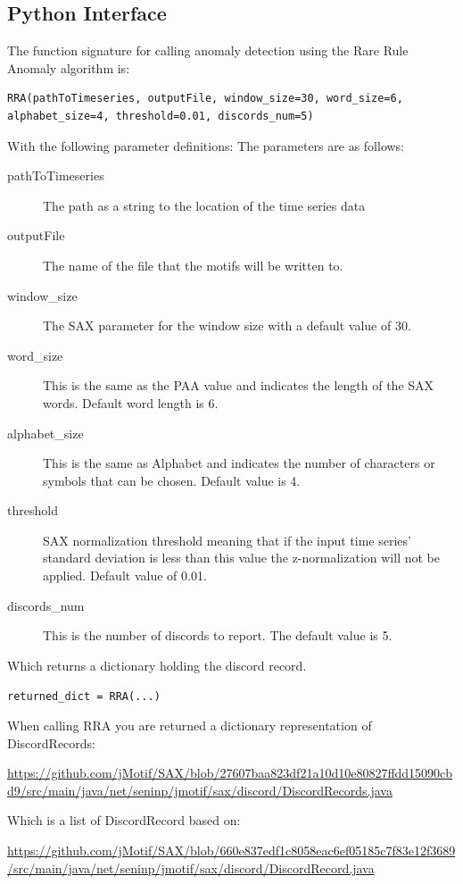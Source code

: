 \documentclass[letterpaper, 12pt]{article}
\begin{document}
\subsection{Python Interface}
The function signature for calling anomaly detection using the Rare Rule Anomaly algorithm is:
\begin{lstlisting}
RRA(pathToTimeseries, outputFile, window_size=30, word_size=6, alphabet_size=4, threshold=0.01, discords_num=5)
\end{lstlisting}

With the following parameter definitions:
The parameters are as follows:
\begin{description}
	\item[pathToTimeseries] The path as a string to the location of the time series data
	\item[outputFile] The name of the file that the motifs will be written to.
	\item[window\_size] The SAX parameter for the window size with a default value of 30.
	\item[word\_size] This is the same as the PAA value and indicates the length of the SAX words.  Default word length is 6.
	\item[alphabet\_size] This is the same as Alphabet and indicates the number of characters or symbols that can be chosen.  Default value is 4.
	
	\item[threshold] SAX normalization threshold meaning that if the input time series' standard deviation is less than this value the z-normalization will not be applied. Default value of 0.01.
	\item[discords\_num] This is the number of discords to report.  The default value is 5.
\end{description}
	
Which returns a dictionary holding the discord record.

\texttt{returned\_dict = RRA(...)}

When calling RRA you are returned a dictionary representation of DiscordRecords:

\url{https://github.com/jMotif/SAX/blob/27607baa823df21a10d10e80827ffdd15090cbd9/src/main/java/net/seninp/jmotif/sax/discord/DiscordRecords.java}

Which is a list of DiscordRecord based on:

\url{https://github.com/jMotif/SAX/blob/660e837edf1c8058eac6ef05185c7f83e12f3689/src/main/java/net/seninp/jmotif/sax/discord/DiscordRecord.java}
\end{document}
